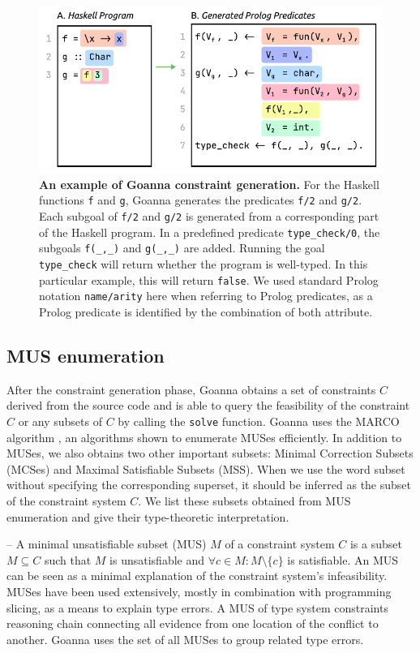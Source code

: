 \documentclass[pdflatex,sn-nature,Numbered]{sn-jnl}%
\begin{document}
  \begin{figure}[htb]
        \centering
    \includegraphics[width=0.7\linewidth]{images/Translation-Example}
        \caption[An example of Goanna constraint generation]{\textbf{An example of Goanna constraint generation.} For the Haskell functions \texttt{f} and \texttt{g}, Goanna generates the predicates \texttt{f/2} and \texttt{g/2}. Each subgoal of \texttt{f/2} and \texttt{g/2} is generated from a corresponding part of the Haskell program. In a predefined predicate \texttt{type\_check/0}, the subgoals \texttt{f(\_,\_)} and \texttt{g(\_,\_)} are added. Running the goal \texttt{type\_check} will return whether the program is well-typed. In this particular example, this will return \texttt{false}. We used standard Prolog notation \texttt{name/arity} here when referring to Prolog predicates, as a Prolog predicate is identified by the combination of both attribute. 
}
        \label{fig:translation-example}
    \end{figure}
    

    \subsection{MUS enumeration} \label{sub:enumeration}
    After the constraint generation phase, Goanna obtains a set of constraints $C$ derived from the source code and is able to query the feasibility of the constraint $C$ or any subsets of $C$ by calling the \texttt{solve} function. Goanna uses the MARCO algorithm \cite{Liffiton2016-xi}, an algorithms shown to enumerate MUSes efficiently. In addition to MUSes, we also obtains two other important subsets: Minimal Correction Subsets (MCSes) and Maximal Satisfiable Subsets (MSS). When we use the word subset without specifying the corresponding superset, it should be inferred as the subset of the constraint system $C$. We list these subsets obtained from MUS enumeration and give their type-theoretic interpretation. 
        
    – A minimal unsatisfiable subset (MUS) $M$ of a constraint system $C$ is a subset $M \subseteq C$ such that $M$ is unsatisfiable and $ \forall{c} \in M : M \setminus \{c\}$ is satisfiable. An MUS can be seen as a minimal explanation of the constraint system’s infeasibility. MUSes have been used extensively, mostly in combination with programming slicing, as a means to explain type errors. A MUS of type system constraints reasoning chain connecting all evidence from one location of the conflict to another. Goanna uses the set of all MUSes to group related type errors.
\end{document}
